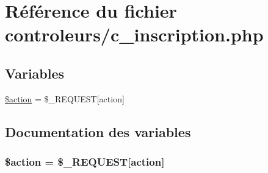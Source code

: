 \hypertarget{c__inscription_8php}{}\section{Référence du fichier controleurs/c\+\_\+inscription.php}
\label{c__inscription_8php}
\subsection*{Variables}
\begin{DoxyCompactItemize}
\item 
\hyperlink{c__inscription_8php_aa698a3e72116e8e778be0e95d908ee30}{\$action} = \$\+\_\+\+R\+E\+Q\+U\+E\+S\+T\mbox{[}\textquotesingle{}action\textquotesingle{}\mbox{]}
\end{DoxyCompactItemize}


\subsection{Documentation des variables}
\hypertarget{c__inscription_8php_aa698a3e72116e8e778be0e95d908ee30}{}
\subsubsection[{\$action}]{\setlength{\rightskip}{0pt plus 5cm}\$action = \$\+\_\+\+R\+E\+Q\+U\+E\+S\+T\mbox{[}\textquotesingle{}action\textquotesingle{}\mbox{]}}\label{c__inscription_8php_aa698a3e72116e8e778be0e95d908ee30}
